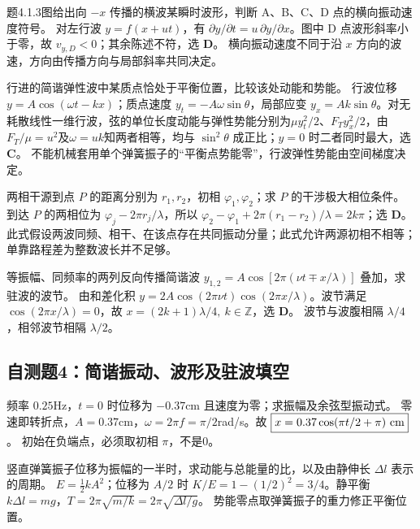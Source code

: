 \problemtext 题4.1.3图给出向 $-x$ 传播的横波某瞬时波形，判断 A、B、C、D 点的横向振动速度符号。
\workings 对左行波 $y=f(x+ut)$，有 $\partial y/\partial t=u\,\partial y/\partial x$。图中 D 点波形斜率小于零，故 $v_{y,D}<0$；其余陈述不符，选 \textbf{D}。
\crosscheck 横向振动速度不同于沿 $x$ 方向的波速，方向由传播方向与局部斜率共同决定。

\problemtext 行进的简谐弹性波中某质点恰处于平衡位置，比较该处动能和势能。
\workings 行波位移 $y=A\cos(\omega t-kx)$；质点速度 $y_t=-A\omega\sin\theta$，局部应变 $y_x=Ak\sin\theta$。对无耗散线性一维行波，弦的单位长度动能与弹性势能分别为$\mu y_t^2/2$、$F_T y_x^2/2$，由$F_T/\mu=u^2$及$\omega=uk$知两者相等，均与 $\sin^2\theta$ 成正比；$y=0$ 时二者同时最大，选 \textbf{C}。
\crosscheck 不能机械套用单个弹簧振子的“平衡点势能零”，行波弹性势能由空间梯度决定。

\problemtext 两相干源到点 $P$ 的距离分别为 $r_1,r_2$，初相 $\varphi_1,\varphi_2$；求 $P$ 的干涉极大相位条件。
\workings 到达 $P$ 的两相位为 $\varphi_j-2\pi r_j/\lambda$，所以 $\boxed{\varphi_2-\varphi_1+2\pi(r_1-r_2)/\lambda=2k\pi}$；选 \textbf{D}。
\crosscheck 此式假设两波同频、相干、在该点存在共同振动分量；此式允许两源初相不相等；单靠路程差为整数波长并不足够。

\problemtext 等振幅、同频率的两列反向传播简谐波 $y_{1,2}=A\cos[2\pi(\nu t\mp x/\lambda)]$ 叠加，求驻波的波节。
\workings 由和差化积 $y=2A\cos(2\pi\nu t)\cos(2\pi x/\lambda)$。波节满足 $\cos(2\pi x/\lambda)=0$，故 $\boxed{x=(2k+1)\lambda/4,\ k\in\mathbb Z}$，选 \textbf{D}。
\crosscheck 波节与波腹相隔 $\lambda/4$，相邻波节相隔 $\lambda/2$。

\subsection{自测题4：简谐振动、波形及驻波填空}

\problemtext 频率 $0.25$Hz，$t=0$ 时位移为 $-0.37$cm 且速度为零；求振幅及余弦型振动式。
\workings 零速即转折点，$A=0.37$cm，$\omega=2\pi f=\pi/2$rad/s。故 $\boxed{x=0.37\cos(\pi t/2+\pi)\ {\rm cm}}$。
\crosscheck 初始在负端点，必须取初相 $\pi$，不是0。

\problemtext 竖直弹簧振子位移为振幅的一半时，求动能与总能量的比，以及由静伸长 $\Delta l$ 表示的周期。
\workings $E=\frac12kA^2$；位移为 $A/2$ 时 $K/E=1-(1/2)^2=\boxed{3/4}$。静平衡 $k\Delta l=mg$，$T=2\pi\sqrt{m/k}=\boxed{2\pi\sqrt{\Delta l/g}}$。
\crosscheck 势能零点取弹簧振子的重力修正平衡位置。

